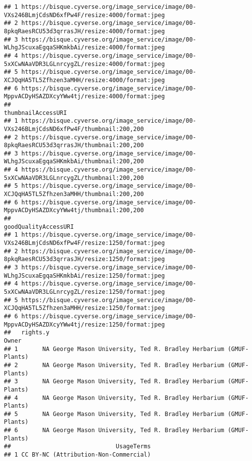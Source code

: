 \documentclass[
]{article}
\begin{document}
\begin{verbatim}
## 1 https://bisque.cyverse.org/image_service/image/00-VXs246BLmjCdsND6xfPw4F/resize:4000/format:jpeg
## 2 https://bisque.cyverse.org/image_service/image/00-8pkqRaesRCU53d3qrrasJH/resize:4000/format:jpeg
## 3 https://bisque.cyverse.org/image_service/image/00-WLhgJScuxaEgqaSHKmkbAi/resize:4000/format:jpeg
## 4 https://bisque.cyverse.org/image_service/image/00-5xXCwNAaVDR3LGLnrcygZL/resize:4000/format:jpeg
## 5 https://bisque.cyverse.org/image_service/image/00-XCJQqHA5TL5Zfhzen3aMHH/resize:4000/format:jpeg
## 6 https://bisque.cyverse.org/image_service/image/00-MppvACDyHSAZDXcyYWw4tj/resize:4000/format:jpeg
##                                                                           thumbnailAccessURI
## 1 https://bisque.cyverse.org/image_service/image/00-VXs246BLmjCdsND6xfPw4F/thumbnail:200,200
## 2 https://bisque.cyverse.org/image_service/image/00-8pkqRaesRCU53d3qrrasJH/thumbnail:200,200
## 3 https://bisque.cyverse.org/image_service/image/00-WLhgJScuxaEgqaSHKmkbAi/thumbnail:200,200
## 4 https://bisque.cyverse.org/image_service/image/00-5xXCwNAaVDR3LGLnrcygZL/thumbnail:200,200
## 5 https://bisque.cyverse.org/image_service/image/00-XCJQqHA5TL5Zfhzen3aMHH/thumbnail:200,200
## 6 https://bisque.cyverse.org/image_service/image/00-MppvACDyHSAZDXcyYWw4tj/thumbnail:200,200
##                                                                               goodQualityAccessURI
## 1 https://bisque.cyverse.org/image_service/image/00-VXs246BLmjCdsND6xfPw4F/resize:1250/format:jpeg
## 2 https://bisque.cyverse.org/image_service/image/00-8pkqRaesRCU53d3qrrasJH/resize:1250/format:jpeg
## 3 https://bisque.cyverse.org/image_service/image/00-WLhgJScuxaEgqaSHKmkbAi/resize:1250/format:jpeg
## 4 https://bisque.cyverse.org/image_service/image/00-5xXCwNAaVDR3LGLnrcygZL/resize:1250/format:jpeg
## 5 https://bisque.cyverse.org/image_service/image/00-XCJQqHA5TL5Zfhzen3aMHH/resize:1250/format:jpeg
## 6 https://bisque.cyverse.org/image_service/image/00-MppvACDyHSAZDXcyYWw4tj/resize:1250/format:jpeg
##   rights.y                                                           Owner
## 1       NA George Mason University, Ted R. Bradley Herbarium (GMUF-Plants)
## 2       NA George Mason University, Ted R. Bradley Herbarium (GMUF-Plants)
## 3       NA George Mason University, Ted R. Bradley Herbarium (GMUF-Plants)
## 4       NA George Mason University, Ted R. Bradley Herbarium (GMUF-Plants)
## 5       NA George Mason University, Ted R. Bradley Herbarium (GMUF-Plants)
## 6       NA George Mason University, Ted R. Bradley Herbarium (GMUF-Plants)
##                              UsageTerms
## 1 CC BY-NC (Attribution-Non-Commercial)

\end{verbatim}
\end{document}
